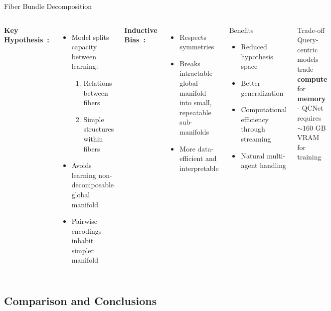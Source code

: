 \documentclass[10pt,aspectratio=169]{beamer}
\begin{document}
\begin{frame}{Fiber Bundle Decomposition}
\begin{columns}[T]
\textbf{Key Hypothesis~\cite{qcnetZhou2023}:}
\begin{itemize}
    \item Model splits capacity between learning:
    \begin{enumerate}
        \item Relations between fibers
        \item Simple structures within fibers
    \end{enumerate}
    \item Avoids learning non-decomposable global manifold
    \item Pairwise encodings inhabit simpler manifold
\end{itemize}

\textbf{Inductive Bias~\cite{qcnetZhou2023}:}
\begin{itemize}
    \item Respects symmetries
    \item Breaks intractable global manifold into small, repeatable sub-manifolds
    \item More data-efficient and interpretable
\end{itemize}

\begin{block}{Benefits}
\begin{itemize}
    \item Reduced hypothesis space
    \item Better generalization
    \item Computational efficiency through streaming
    \item Natural multi-agent handling
\end{itemize}
\end{block}

\begin{alertblock}{Trade-off}
Query-centric models trade \textbf{compute} for \textbf{memory} - QCNet requires $\sim 160$ GB VRAM for training~\cite{qcnetZhou2023}
\end{alertblock}
\end{columns}
\end{frame}

\subsection{Comparison and Conclusions}
\end{document}
